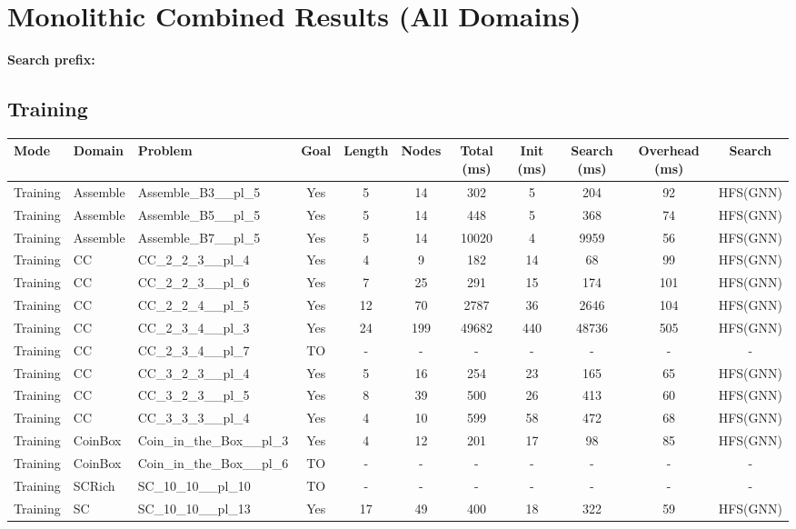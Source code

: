 \documentclass{article}
\begin{document}
\section*{Monolithic Combined Results (All Domains)}
\textbf{Search prefix:} 
\\[0.5cm]
\subsection*{Training}
\begin{tabular}{lllcccccccc}
\toprule
Mode & Domain & Problem & Goal & Length & Nodes & Total (ms) & Init (ms) & Search (ms) & Overhead (ms) & Search \\
\midrule
Training & Assemble & Assemble\_B3\_\_pl\_5 & Yes & 5 & 14 & 302 & 5 & 204 & 92 & HFS(GNN) \\
Training & Assemble & Assemble\_B5\_\_pl\_5 & Yes & 5 & 14 & 448 & 5 & 368 & 74 & HFS(GNN) \\
Training & Assemble & Assemble\_B7\_\_pl\_5 & Yes & 5 & 14 & 10020 & 4 & 9959 & 56 & HFS(GNN) \\
Training & CC & CC\_2\_2\_3\_\_pl\_4 & Yes & 4 & 9 & 182 & 14 & 68 & 99 & HFS(GNN) \\
Training & CC & CC\_2\_2\_3\_\_pl\_6 & Yes & 7 & 25 & 291 & 15 & 174 & 101 & HFS(GNN) \\
Training & CC & CC\_2\_2\_4\_\_pl\_5 & Yes & 12 & 70 & 2787 & 36 & 2646 & 104 & HFS(GNN) \\
Training & CC & CC\_2\_3\_4\_\_pl\_3 & Yes & 24 & 199 & 49682 & 440 & 48736 & 505 & HFS(GNN) \\
Training & CC & CC\_2\_3\_4\_\_pl\_7 & TO & - & - & - & - & - & - & - \\
Training & CC & CC\_3\_2\_3\_\_pl\_4 & Yes & 5 & 16 & 254 & 23 & 165 & 65 & HFS(GNN) \\
Training & CC & CC\_3\_2\_3\_\_pl\_5 & Yes & 8 & 39 & 500 & 26 & 413 & 60 & HFS(GNN) \\
Training & CC & CC\_3\_3\_3\_\_pl\_4 & Yes & 4 & 10 & 599 & 58 & 472 & 68 & HFS(GNN) \\
Training & CoinBox & Coin\_in\_the\_Box\_\_pl\_3 & Yes & 4 & 12 & 201 & 17 & 98 & 85 & HFS(GNN) \\
Training & CoinBox & Coin\_in\_the\_Box\_\_pl\_6 & TO & - & - & - & - & - & - & - \\
Training & SCRich & SC\_10\_10\_\_pl\_10 & TO & - & - & - & - & - & - & - \\
Training & SC & SC\_10\_10\_\_pl\_13 & Yes & 17 & 49 & 400 & 18 & 322 & 59 & HFS(GNN) \\

\end{tabular}
\end{document}

